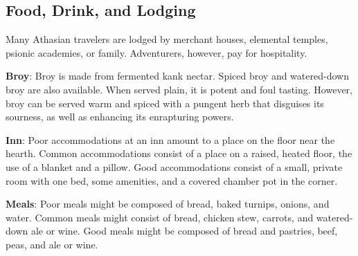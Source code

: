 \subsection{Food, Drink, and Lodging}
Many Athasian travelers are lodged by merchant houses, elemental temples, psionic academies, or family. Adventurers, however, pay for hospitality.


\textbf{Broy}: Broy is made from fermented kank nectar. Spiced broy and watered-down broy are also available. When served plain, it is potent and foul tasting. However, broy can be served warm and spiced with a pungent herb that disguises its sourness, as well as enhancing its enrapturing powers.

\textbf{Inn}: Poor accommodations at an inn amount to a place on the floor near the hearth. Common accommodations consist of a place on a raised, heated floor, the use of a blanket and a pillow. Good accommodations consist of a small, private room with one bed, some amenities, and a covered chamber pot in the corner.

\textbf{Meals}: Poor meals might be composed of bread, baked turnips, onions, and water. Common meals might consist of bread, chicken stew, carrots, and watered-down ale or wine. Good meals might be composed of bread and pastries, beef, peas, and ale or wine.